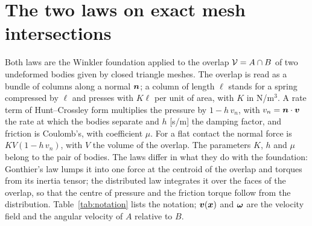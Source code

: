 \section{The two laws on exact mesh intersections}\label{sec:methods}


Both laws are the Winkler foundation applied to the overlap $\mathcal{V} = A\cap B$ of two
undeformed bodies given by closed triangle meshes. The overlap is read as a bundle of columns
along a normal $\boldsymbol{n}$; a column of length $\ell$ stands for a spring compressed by $\ell$ and
presses with $K\ell$ per unit of area, with $K$ in N/m$^3$. A rate term of Hunt--Crossley form
multiplies the pressure by $1 - h\,v_n$, with $v_n = \boldsymbol{n}\cdot\boldsymbol{v}$ the rate at which the bodies
separate and $h$ [s/m] the damping factor, and friction is Coulomb's, with coefficient $\mu$.
For a flat contact the normal force is $K V(1 - h\,v_n)$, with $V$ the volume of the overlap.
The parameters $K$, $h$ and $\mu$ belong to the pair of bodies. The laws differ in what they do
with the foundation: Gonthier's law lumps it into one force at the centroid of the overlap and
torques from its inertia tensor; the distributed law integrates it over the faces of the
overlap, so that the centre of pressure and the friction torque follow from the distribution.
Table~\ref{tab:notation} lists the notation; $\boldsymbol{v}(\boldsymbol{x})$ and $\boldsymbol{\omega}$ are the velocity field and the
angular velocity of $A$ relative to $B$.

